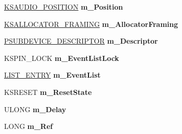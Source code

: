 \begin{DoxyCompactItemize}
\hyperlink{struct_k_s_a_u_d_i_o___p_o_s_i_t_i_o_n}{K\+S\+A\+U\+D\+I\+O\+\_\+\+P\+O\+S\+I\+T\+I\+ON} {\bfseries m\+\_\+\+Position}
\item 
\mbox{\label{class_c_port_pin_wave_cyclic_ad3b8e28d69edee9d403a96e4f191295a}} 
\hyperlink{struct_k_s_a_l_l_o_c_a_t_o_r___f_r_a_m_i_n_g}{K\+S\+A\+L\+L\+O\+C\+A\+T\+O\+R\+\_\+\+F\+R\+A\+M\+I\+NG} {\bfseries m\+\_\+\+Allocator\+Framing}
\item 
\mbox{\label{class_c_port_pin_wave_cyclic_a470773f1347fbefd3c0c42ffb8c5cef4}} 
\hyperlink{struct_s_u_b_d_e_v_i_c_e___d_e_s_c_r_i_p_t_o_r}{P\+S\+U\+B\+D\+E\+V\+I\+C\+E\+\_\+\+D\+E\+S\+C\+R\+I\+P\+T\+OR} {\bfseries m\+\_\+\+Descriptor}
\item 
\mbox{\label{class_c_port_pin_wave_cyclic_a13e6b8b23eb2bf647183a1c4131035ca}} 
K\+S\+P\+I\+N\+\_\+\+L\+O\+CK {\bfseries m\+\_\+\+Event\+List\+Lock}
\item 
\mbox{\label{class_c_port_pin_wave_cyclic_a818700e1294c21794a3b025192d5978d}} 
\hyperlink{struct___l_i_s_t___e_n_t_r_y}{L\+I\+S\+T\+\_\+\+E\+N\+T\+RY} {\bfseries m\+\_\+\+Event\+List}
\item 
\mbox{\label{class_c_port_pin_wave_cyclic_a70988f141fbf960486c882a611619cb8}} 
K\+S\+R\+E\+S\+ET {\bfseries m\+\_\+\+Reset\+State}
\item 
\mbox{\label{class_c_port_pin_wave_cyclic_a19791762f1d5814bcbc73be77ea5aaac}} 
U\+L\+O\+NG {\bfseries m\+\_\+\+Delay}
\item 
\mbox{\label{class_c_port_pin_wave_cyclic_acabc6c3ba02c83204dfa9fb709fc406b}} 
L\+O\+NG {\bfseries m\+\_\+\+Ref}
\end{DoxyCompactItemize}
